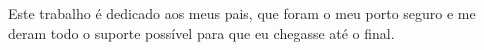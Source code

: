
\begin{dedicatoria}
   \vspace*{\fill}
   	\begin{flushright}
   \noindent
   Este trabalho é dedicado aos meus pais, que foram o meu porto seguro e me deram todo o suporte possível para que eu chegasse até o final.
   	\end{flushright}
\end{dedicatoria}
